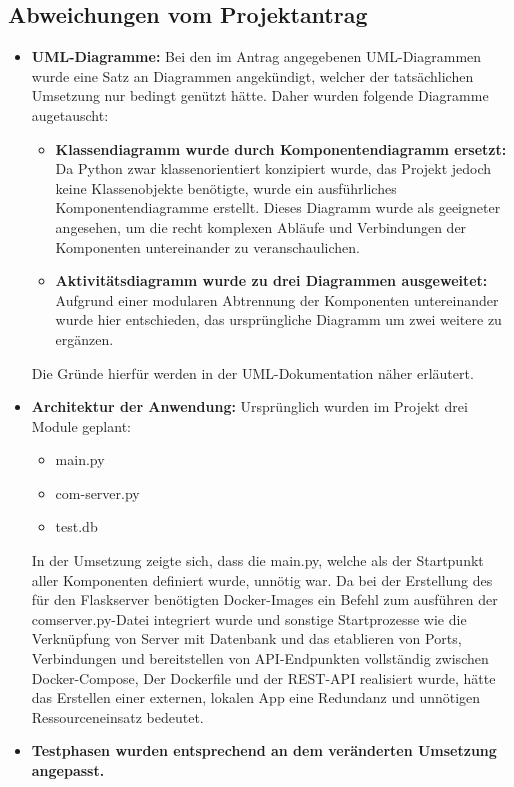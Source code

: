 \subsection{Abweichungen vom Projektantrag}\label{sec:AbweichungenProjektantrag}
\begin{itemize}
    \item \textbf{UML-Diagramme:} Bei den im Antrag angegebenen UML-Diagrammen wurde eine Satz an Diagrammen angekündigt, welcher der tatsächlichen Umsetzung nur bedingt genützt hätte. Daher wurden folgende Diagramme augetauscht:
    \begin{itemize}
        \item \textbf{Klassendiagramm wurde durch Komponentendiagramm ersetzt:} Da Python zwar klassenorientiert konzipiert wurde, das Projekt jedoch keine Klassenobjekte benötigte, wurde ein ausführliches Komponentendiagramme erstellt. Dieses Diagramm wurde als geeigneter angesehen, um die recht komplexen Abläufe und Verbindungen der Komponenten untereinander zu veranschaulichen.
        \item \textbf{Aktivitätsdiagramm wurde zu drei Diagrammen ausgeweitet:} Aufgrund einer modularen Abtrennung der Komponenten untereinander wurde hier entschieden, das ursprüngliche Diagramm um zwei weitere zu ergänzen.
    \end{itemize}
    Die Gründe hierfür werden in der UML-Dokumentation näher erläutert.
\end{itemize}
\begin{itemize}
\item \textbf{Architektur der Anwendung:} Ursprünglich wurden im Projekt drei Module geplant:
	\begin{itemize}
    	\item main.py
    	\item com-server.py
    	\item test.db
	\end{itemize}
In der Umsetzung zeigte sich, dass die main.py, welche als der Startpunkt aller Komponenten definiert wurde, unnötig war. Da bei der Erstellung des für den Flaskserver benötigten Docker-Images ein Befehl zum ausführen der comserver.py-Datei integriert wurde und sonstige Startprozesse wie die Verknüpfung von Server mit Datenbank und das etablieren von Ports, Verbindungen und bereitstellen von API-Endpunkten vollständig zwischen Docker-Compose, Der Dockerfile und der REST-API realisiert wurde, hätte das Erstellen einer externen, lokalen App eine Redundanz und unnötigen Ressourceneinsatz bedeutet.
\end{itemize}
\begin{itemize}\item \textbf{Testphasen wurden entsprechend an dem veränderten Umsetzung angepasst.}
\end{itemize}

